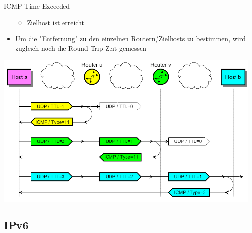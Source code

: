 \begin{definition}{ICMP Time Exceeded}
\begin{itemize}
\begin{itemize}
            \item Zielhost ist erreicht
        \end{itemize}
        \item Um die "Entfernung" zu den einzelnen Routern/Zielhosts zu bestimmen, wird zugleich noch die Round-Trip Zeit gemessen
    \end{itemize}
        \includegraphics[width=1\linewidth]{images/traceroute.png}
\end{definition}

\subsection{IPv6}


